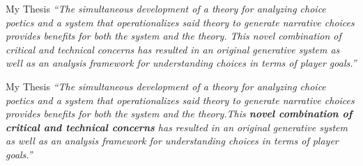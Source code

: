 \documentclass[xcolor=x11names]{beamer}
\begin{document}
%

\begin{frame}{My Thesis}
  \justifying
  \itshape
  ``The simultaneous development of a theory for analyzing choice poetics and a system that operationalizes said theory to generate narrative choices provides benefits for both the system and the theory. This novel combination of critical and technical concerns has resulted in an original generative system as well as an analysis framework for understanding choices in terms of player goals.''
\end{frame}

\begin{frame}{My Thesis}
  \justifying
  \itshape
  ``The simultaneous development of a theory for analyzing choice poetics and a system that operationalizes said theory to generate narrative choices provides benefits for both the system and the theory.This \textbf{novel combination of critical and technical concerns} has resulted in an original generative system as well as an analysis framework for understanding choices in terms of player goals.''
\end{frame}
\end{document}
